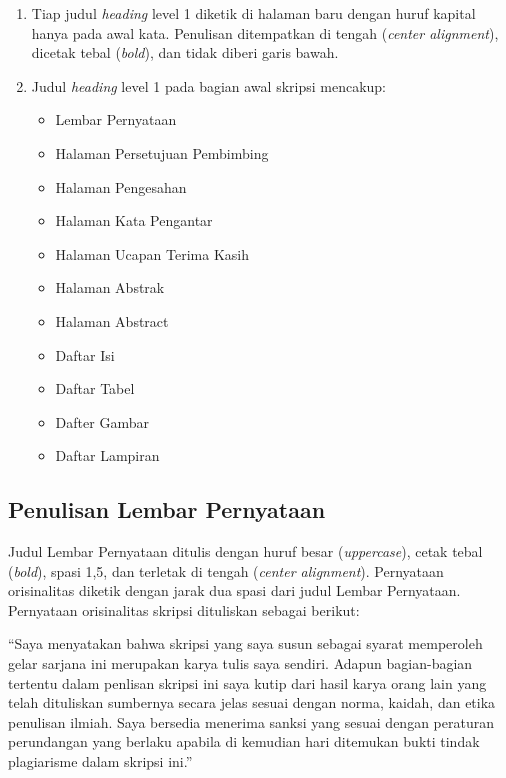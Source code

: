 \documentclass[
  indonesian,
  letterpaper,
]{scrbook}
\providecommand{\tightlist}{%
  \setlength{\itemsep}{0pt}\setlength{\parskip}{0pt}}
\begin{document}
\begin{enumerate}
\def\labelenumi{\arabic{enumi}.}
\tightlist
\item
  Tiap judul \emph{heading} level 1 diketik di halaman baru dengan huruf
  kapital hanya pada awal kata. Penulisan ditempatkan di tengah
  (\emph{center alignment}), dicetak tebal (\emph{bold}), dan tidak
  diberi garis bawah.
\item
  Judul \emph{heading} level 1 pada bagian awal skripsi mencakup:~

  \begin{itemize}
  \tightlist
  \item
    Lembar Pernyataan
  \item
    Halaman Persetujuan Pembimbing
  \item
    Halaman Pengesahan
  \item
    Halaman Kata Pengantar
  \item
    Halaman Ucapan Terima Kasih
  \item
    Halaman Abstrak
  \item
    Halaman Abstract
  \item
    Daftar Isi
  \item
    Daftar Tabel
  \item
    Dafter Gambar
  \item
    Daftar Lampiran
  \end{itemize}
\end{enumerate}

\subsection{Penulisan Lembar
Pernyataan}\label{penulisan-lembar-pernyataan}

Judul Lembar Pernyataan ditulis dengan huruf besar (\emph{uppercase}),
cetak tebal (\emph{bold}), spasi 1,5, dan terletak di tengah
(\emph{center alignment}). Pernyataan orisinalitas diketik dengan jarak
dua spasi dari judul Lembar Pernyataan. Pernyataan orisinalitas skripsi
dituliskan sebagai berikut:

``Saya menyatakan bahwa skripsi yang saya susun sebagai syarat
memperoleh gelar sarjana ini merupakan karya tulis saya sendiri. Adapun
bagian-bagian tertentu dalam penlisan skripsi ini saya kutip dari hasil
karya orang lain yang telah dituliskan sumbernya secara jelas sesuai
dengan norma, kaidah, dan etika penulisan ilmiah. Saya bersedia menerima
sanksi yang sesuai dengan peraturan perundangan yang berlaku apabila di
kemudian hari ditemukan bukti tindak plagiarisme dalam skripsi ini.''
\end{document}
